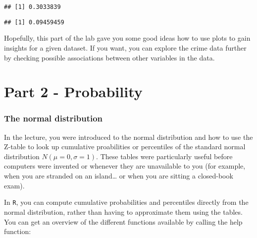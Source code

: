 \documentclass[
]{book}
\newenvironment{Shaded}{\begin{snugshade}}{\end{snugshade}}
\newcommand{\CommentTok}[1]{\textcolor[rgb]{0.56,0.35,0.01}{\textit{#1}}}
\newcommand{\FunctionTok}[1]{\textcolor[rgb]{0.13,0.29,0.53}{\textbf{#1}}}
\newcommand{\NormalTok}[1]{#1}
\newcommand{\OtherTok}[1]{\textcolor[rgb]{0.56,0.35,0.01}{#1}}
\newcommand{\SpecialCharTok}[1]{\textcolor[rgb]{0.81,0.36,0.00}{\textbf{#1}}}
\newcommand{\StringTok}[1]{\textcolor[rgb]{0.31,0.60,0.02}{#1}}
\begin{document}
\begin{verbatim}
## [1] 0.3033839
\end{verbatim}

\begin{Shaded}
\end{Shaded}

\begin{verbatim}
## [1] 0.09459459
\end{verbatim}

Hopefully, this part of the lab gave you some good ideas how to use plots to gain insights for a given dataset. If you want, you can explore the crime data further by checking possible associations between other variables in the data.

\hypertarget{part-2---probability}{%
\chapter{Part 2 - Probability}\label{part-2---probability}}

\hypertarget{the-normal-distribution}{%
\subsection{The normal distribution}\label{the-normal-distribution}}

In the lecture, you were introduced to the normal distribution and how to use the Z-table to look up cumulative proabilities or percentiles of the standard normal distribution \(N(\mu=0,\sigma=1)\). These tables were particularly useful before computers were invented or whenever they are unavailable to you (for example, when you are stranded on an island\ldots{} or when you are sitting a closed-book exam).

In \texttt{R}, you can compute cumulative probabilities and percentiles directly from the normal distribution, rather than having to approximate them using the tables. You can get an overview of the different functions available by calling the help function:
\end{document}
